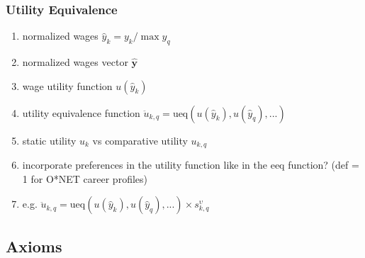 \documentclass{elsarticle} %
\begin{document}
\subsubsection{Utility Equivalence}
\begin{enumerate}
    \item normalized wages $\hat{y}_k = y_k / \max y_q$
    \item normalized wages vector $\boldsymbol{\hat{y}}$
    \item wage utility function $u(\hat{y}_k)$
    \item utility equivalence function $\ddot{u}_{k,q} = \text{ueq}(u(\hat{y}_k),
              u(\hat{y}_q), ...)$
    \item static utility $u_k$ vs comparative utility $u_{k,q}$
    \item incorporate preferences in the utility function like in the eeq function? (def
          = 1 for O*NET career profiles)
    \item e.g. $\ddot{u}_{k,q} = \text{ueq}(u(\hat{y}_k), u(\hat{y}_q), ...) \times
              s_{k,q}^{\upsilon}$
\end{enumerate}

\subsection{Axioms}
\end{document}

